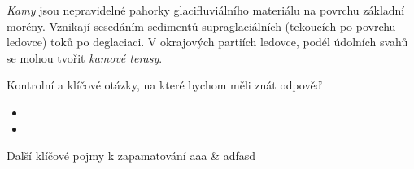 \emph{Kamy} jsou nepravidelné pahorky glacifluviálního materiálu na povrchu základní morény. Vznikají sesedáním sedimentů supraglaciálních (tekoucích po povrchu ledovce) toků po deglaciaci. V okrajových partiích ledovce, podél údolních svahů se mohou tvořit \emph{kamové terasy}.

\newpage
\onecolumn
\begin{boxotazky}{Kontrolní a klíčové otázky, na které bychom měli znát odpověď}
	\begin{itemize}
		\item 
		\item 
		
	\end{itemize}
\end{boxotazky}

\begin{boxslovnik}{Další klíčové pojmy k zapamatování}
	aaa & adfasd \\
	
\end{boxslovnik}
\twocolumn